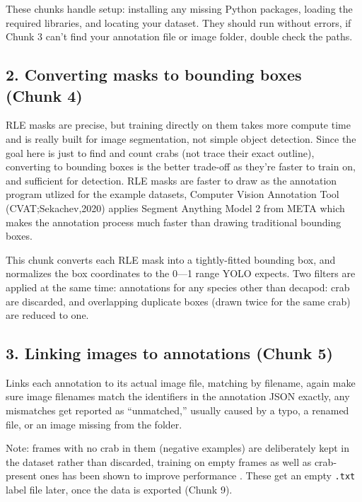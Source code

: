 \documentclass[
]{book}
\begin{document}
These chunks handle setup: installing any missing Python packages, loading the required libraries, and locating your dataset. They should run without errors, if Chunk 3 can't find your annotation file or image folder, double check the paths.

\subsection*{2. Converting masks to bounding boxes (Chunk 4)}\label{converting-masks-to-bounding-boxes-chunk-4}

RLE masks are precise, but training directly on them takes more compute time and is really built for image segmentation, not simple object detection. Since the goal here is just to find and count crabs (not trace their exact outline), converting to bounding boxes is the better trade-off as they're faster to train on, and sufficient for detection. RLE masks are faster to draw as the annotation program utlized for the example datasets, Computer Vision Annotation Tool (CVAT;Sekachev,2020) applies Segment Anything Model 2 from META \citep{ravi_sam_2024} which makes the annotation process much faster than drawing traditional bounding boxes.

This chunk converts each RLE mask into a tightly-fitted bounding box, and normalizes the box coordinates to the 0---1 range YOLO expects. Two filters are applied at the same time: annotations for any species other than decapod: crab are discarded, and overlapping duplicate boxes (drawn twice for the same crab) are reduced to one.

\subsection*{3. Linking images to annotations (Chunk 5)}\label{linking-images-to-annotations-chunk-5}

Links each annotation to its actual image file, matching by filename, again make sure image filenames match the identifiers in the annotation JSON exactly, any mismatches get reported as ``unmatched,'' usually caused by a typo, a renamed file, or an image missing from the folder.

Note: frames with no crab in them (negative examples) are deliberately kept in the dataset rather than discarded, training on empty frames as well as crab-present ones has been shown to improve performance \citep{sorrenti_weakly_2025}. These get an empty \texttt{.txt} label file later, once the data is exported (Chunk 9).
\end{document}
